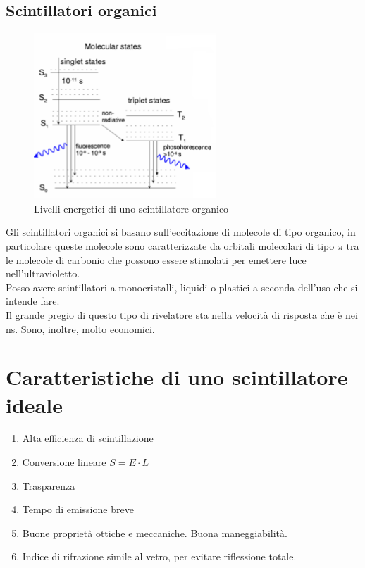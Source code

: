 \subsection{Scintillatori organici}
\begin{figure}[htb]
\begin{center}
\includegraphics[scale=1.00]{./Immagini/LivelliEnergeticiScintillatoreOrganico.png}
\caption{Livelli energetici di uno scintillatore organico}
\label{fig:livOrganico}
\end{center}
\end{figure}
Gli scintillatori organici si basano sull'eccitazione di molecole di tipo organico, in particolare queste molecole sono caratterizzate
da orbitali molecolari di tipo $\pi$ tra le molecole di carbonio che possono essere stimolati per emettere luce nell'ultravioletto.\\
Posso avere scintillatori a monocristalli, liquidi o plastici a seconda dell'uso che si intende fare.\\
Il grande pregio di questo tipo di rivelatore sta nella velocit\`a di risposta che \`e nei ns.
Sono, inoltre, molto economici.
\section{Caratteristiche di uno scintillatore ideale}
\begin{enumerate}
\item Alta efficienza di scintillazione
\item Conversione lineare $S = E \cdot L$
\item Trasparenza 
\item Tempo di emissione breve
\item Buone propriet\`a ottiche e meccaniche. Buona maneggiabilit\`a.
\item Indice di rifrazione simile al vetro, per evitare riflessione totale.
\end{enumerate}
